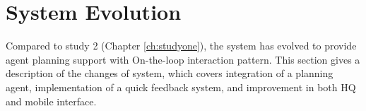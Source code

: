 

\section{System Evolution}\label{sec:studytwosystem}
Compared to study 2 (Chapter \ref{ch:studyone}), the system has evolved to provide agent planning support with On-the-loop interaction pattern. This section gives a description of the changes of system, which covers integration of a planning agent, implementation of a quick feedback system, and improvement in both HQ and mobile interface.

